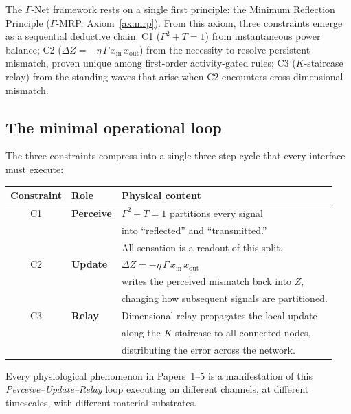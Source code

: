 \documentclass[aps,pre,twocolumn,superscriptaddress,floatfix]{revtex4-2}
\begin{document}
The $\Gamma$-Net framework rests on a single first
principle: the Minimum Reflection Principle
($\Gamma$-MRP, Axiom~\ref{ax:mrp}).
From this axiom, three constraints emerge as a
sequential deductive chain:
C1 ($\Gamma^2 + T = 1$) from instantaneous power balance;
C2 ($\Delta Z = -\eta\,\Gamma\,x_{\text{in}}\,
x_{\text{out}}$) from the necessity to resolve
persistent mismatch, proven unique among first-order
activity-gated rules;
C3 ($K$-staircase relay) from the standing waves
that arise when C2 encounters cross-dimensional
mismatch.

\subsection{The minimal operational loop}

The three constraints compress into a single
three-step cycle that every interface must execute:

\begin{center}
\begin{tabular}{cll}
\hline
\textbf{Constraint} & \textbf{Role}
  & \textbf{Physical content} \\
\hline
C1 & \textbf{Perceive}
  & $\Gamma^2 + T = 1$ partitions every signal \\
  & & into ``reflected'' and ``transmitted.'' \\
  & & All sensation is a readout of this split. \\[3pt]
C2 & \textbf{Update}
  & $\Delta Z = -\eta\,\Gamma\,x_{\text{in}}\,
    x_{\text{out}}$ \\
  & & writes the perceived mismatch back into $Z$, \\
  & & changing how subsequent signals are partitioned. \\[3pt]
C3 & \textbf{Relay}
  & Dimensional relay propagates the local update \\
  & & along the $K$-staircase to all connected nodes, \\
  & & distributing the error across the network. \\
\hline
\end{tabular}
\end{center}

\noindent
Every physiological phenomenon in Papers~1--5 is a
manifestation of this \emph{Perceive--Update--Relay}
loop executing on different channels, at different
timescales, with different material substrates.
\end{document}
